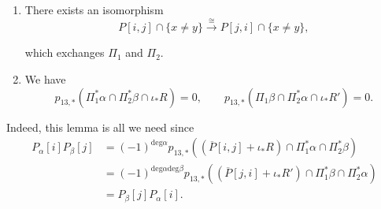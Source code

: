 \begin{lemma}
\label{lemma-pij}
\begin{enumerate}
\item There exists an isomorphism
\begin{equation}
\label{equation-pij-isomorphism}
P[i,j]\cap\{x \neq
y\}\xrightarrow{\cong}P[j,i]\cap \{x \neq
y\},
\end{equation}

\noindent
which exchanges $\Pi_1$ and $\Pi_2$.

\item We have
\begin{equation}
\label{equation-r}
p_{13,*}(\Pi_1^*\alpha\cap\Pi_2^*\beta\cap\iota_*R)=0,\qquad
p_{13,*}(\Pi_1\beta\cap\Pi_2^*\alpha\cap\iota_*R')=0.
\end{equation}
\end{enumerate}
\end{lemma}

\noindent
Indeed, this lemma is all we need since
$$
\begin{aligned}
P_\alpha[i]P_\beta[j]
&=(-1)^{\text{deg}\alpha}p_{13,*}((\overline{P}[i,j]+\iota_*R)\cap\Pi_1^*\alpha\cap\Pi_2^*\beta)\\
&=(-1)^{\text{deg}\alpha\text{deg}\beta}
p_{13,*}((\overline{P}[j,i]+\iota_*R')\cap\Pi_1^*\beta\cap\Pi_2^*\alpha)\\
&=P_\beta[j]P_\alpha[i].
\end{aligned}
$$

